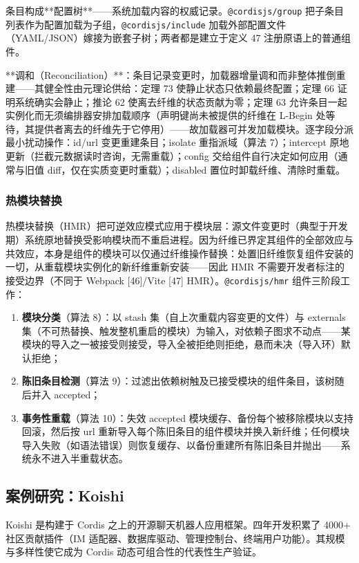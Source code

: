 \documentclass[11pt,a4paper]{article}
\theoremstyle{plain}
\theoremstyle{definition}
\theoremstyle{remark}
\begin{document}
条目构成**配置树**——系统加载内容的权威记录。\texttt{@cordisjs/group} 把子条目列表作为配置加载为子组，\texttt{@cordisjs/include} 加载外部配置文件（YAML/JSON）嫁接为嵌套子树；两者都是建立于定义 47 注册原语上的普通组件。

**调和（Reconciliation）**：条目记录变更时，加载器增量调和而非整体推倒重建——其健全性由元理论供给：定理 73 使静止状态只依赖最终配置；定理 66 证明系统确实会静止；推论 62 使离去纤维的状态贡献为零；定理 63 允许条目一起实例化而无须编排器安排加载顺序（声明键尚未被提供的纤维在 L-Begin 处等待，其提供者离去的纤维先于它停用）——故加载器可并发加载模块。逐字段分派最小扰动操作：id/url 变更重建条目；isolate 重指派域（算法 7）；intercept 原地更新（拦截元数据读时咨询，无需重载）；config 交给组件自行决定如何应用（通常与旧值 diff，仅在实质变更时重载）；disabled 置位时卸载纤维、清除时重载。

\subsubsection{热模块替换}

热模块替换（HMR）把可逆效应模式应用于模块层：源文件变更时（典型于开发期）系统原地替换受影响模块而不重启进程。因为纤维已界定其组件的全部效应与共效应，本身是组件的模块可以仅通过纤维操作替换：处置旧纤维恢复组件安装的一切，从重载模块实例化的新纤维重新安装——因此 HMR 不需要开发者标注的接受边界（不同于 Webpack [46]/Vite [47] HMR）。\texttt{@cordisjs/hmr} 组件三阶段工作：

\begin{enumerate}
\item \textbf{模块分类}（算法 8）：以 stash 集（自上次重载内容变更的文件）与 externals 集（不可热替换、触发整机重启的模块）为输入，对依赖子图求不动点——某模块的导入之一被接受则接受，导入全被拒绝则拒绝，悬而未决（导入环）默认拒绝；
\item \textbf{陈旧条目检测}（算法 9）：过滤出依赖树触及已接受模块的组件条目，该树随后并入 accepted；
\item \textbf{事务性重载}（算法 10）：失效 accepted 模块缓存、备份每个被移除模块以支持回滚，然后按 url 重新导入每个陈旧条目的组件模块并换入新纤维；任何模块导入失败（如语法错误）则恢复缓存、以备份重建所有陈旧条目并抛出——系统永不进入半重载状态。
\end{enumerate}

\subsection{案例研究：Koishi}

Koishi 是构建于 Cordis 之上的开源聊天机器人应用框架。四年开发积累了 4000+ 社区贡献插件（IM 适配器、数据库驱动、管理控制台、终端用户功能）。其规模与多样性使它成为 Cordis 动态可组合性的代表性生产验证。
\end{document}
